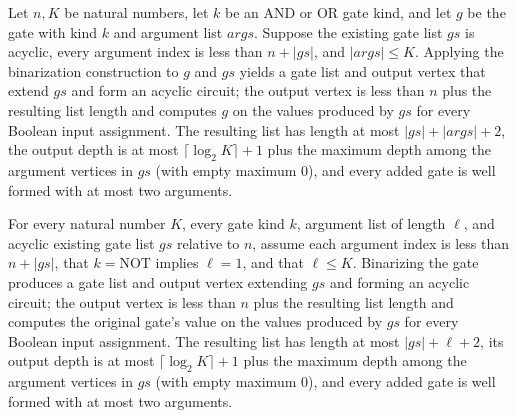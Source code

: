 \begin{theorem}
\label{BoolCircuit.binarizeGadget_andor}
\leanok
{}
Let $n,K$ be natural numbers, let $k$ be an AND or OR gate kind, and let $g$ be the gate
with kind $k$ and argument list $args$. Suppose the existing gate list $gs$ is acyclic,
every argument index is less than $n+|gs|$, and $|args|\le K$. Applying the binarization
construction to $g$ and $gs$ yields a gate list and output vertex that extend $gs$ and
form an acyclic circuit; the output vertex is less than $n$ plus the resulting list
length and computes $g$ on the values produced by $gs$ for every Boolean input
assignment. The resulting list has length at most $|gs|+|args|+2$, the output depth is
at most $\lceil\log_2 K\rceil+1$ plus the maximum depth among the argument vertices in
$gs$ (with empty maximum $0$), and every added gate is well formed with at most two
arguments.
\end{theorem}

\begin{theorem}
\label{BoolCircuit.binarizeGadget_correct}
\leanok
{}
For every natural number $K$, every gate kind $k$, argument list of length $\ell$, and
acyclic existing gate list $gs$ relative to $n$, assume each argument index is less than
$n+|gs|$, that $k=\mathrm{NOT}$ implies $\ell=1$, and that $\ell\le K$. Binarizing the
gate produces a gate list and output vertex extending $gs$ and forming an acyclic
circuit; the output vertex is less than $n$ plus the resulting list length and computes
the original gate's value on the values produced by $gs$ for every Boolean input
assignment. The resulting list has length at most $|gs|+\ell+2$, its output depth is at
most $\lceil\log_2 K\rceil+1$ plus the maximum depth among the argument vertices in $gs$
(with empty maximum $0$), and every added gate is well formed with at most two
arguments.
\end{theorem}

